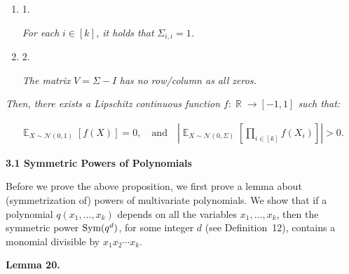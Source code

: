 \documentclass[10pt,a4paper]{article}
\begin{document}
\begin{enumerate}


\item[] 
1. 


\emph{For each }$i\in[k]$\emph{, it holds that }$\Sigma_{i,i}=1$\emph{.}\par





\item[] 
2. 


\emph{The matrix }$V=\Sigma-I$\emph{ has no row/column as all zeros.}\par





\end{enumerate}




\emph{Then, there exists a Lipschitz continuous function $f:\mathop{\mathbb{R}}\to[-1,1]$ such that:}\par


\[\begin{gathered}
\mathop{\mathbb{E}}_{X\sim\mathcal{N}(0,1)}\left[f(X)\right]=0,\quad\text{and}\quad\left|\mathop{\mathbb{E}}_{X\sim\mathcal{N}(0,\Sigma)}\left[\prod_{i\in[k]}f(X_{i})\right]\right|>0.
\end{gathered}\]






\par\medskip\noindent\textbf{
3.1 Symmetric Powers of Polynomials}\par




Before we prove the above proposition, we first prove a lemma about (symmetrization of) powers of multivariate polynomials.
We show that if a polynomial $q(x_{1},\dots,x_{k})$ depends on all the variables $x_{1},\dots,x_{k}$, then the symmetric power $\textnormal{Sym}(q^{d})$, for some integer $d$ (see Definition 12), contains a monomial divisible by $x_{1}x_{2}\cdots x_{k}$.\par





\par\medskip\noindent\textbf{
\textbf{Lemma 20}\textbf{.}
}\par
\end{document}
